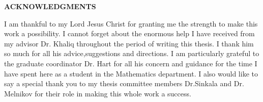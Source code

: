 \documentclass[12pt]{article}
\numberwithin{equation}{subsection} %
\begin{document}
\newpage
\begin{center}

{ \bf ACKNOWLEDGMENTS} \\ [.15in]
\end{center}

I am thankful to my Lord Jesus Christ for granting me the strength
to  make this work a possibility. I cannot forget about the enormous
help I  have received from my advisor Dr. Khaliq throughout the
period of writing this thesis. I thank him so much for all his
advice,suggestions and directions.
 I am particularly grateful to the graduate coordinator Dr. Hart for
 all his concern and guidance for the time I have spent here as a student in
 the Mathematics department.
 I also would like to say a special thank you to my thesis
 committee members Dr.Sinkala and Dr. Melnikov for their role in
 making this whole work a success.






\newpage

\tableofcontents
%
\end{document}
